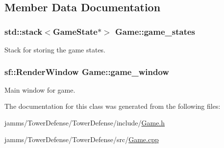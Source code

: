 \subsection{Member Data Documentation}
\hypertarget{class_game_a5ed7be8060ef5d384b62f384fb8662ed}{
\subsubsection[{game\+\_\+states}]{\setlength{\rightskip}{0pt plus 5cm}std\+::stack$<${\bf Game\+State}$\ast$$>$ Game\+::game\+\_\+states}}\label{class_game_a5ed7be8060ef5d384b62f384fb8662ed}


Stack for storing the game states. 

\hypertarget{class_game_ae19475408ec62b8ed6d4109b56d28b1d}{
\subsubsection[{game\+\_\+window}]{\setlength{\rightskip}{0pt plus 5cm}sf\+::\+Render\+Window Game\+::game\+\_\+window}}\label{class_game_ae19475408ec62b8ed6d4109b56d28b1d}


Main window for game. 



The documentation for this class was generated from the following files\+:\begin{DoxyCompactItemize}
\item 
jamms/\+Tower\+Defense/\+Tower\+Defense/include/\hyperlink{_game_8h}{Game.\+h}\item 
jamms/\+Tower\+Defense/\+Tower\+Defense/src/\hyperlink{_game_8cpp}{Game.\+cpp}\end{DoxyCompactItemize}
